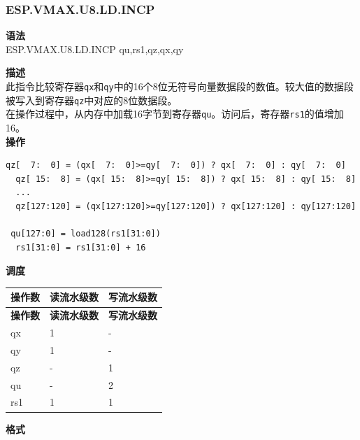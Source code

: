 \newpage
\subsubsection{ESP.VMAX.U8.LD.INCP}\label{instruction:ESPVMAXU8LDINCP}
\textbf{语法}\\
ESP.VMAX.U8.LD.INCP qu,rs1,qz,qx,qy

\textbf{描述}\\
此指令比较寄存器\lstinline{qx}和\lstinline{qy}中的16个8位无符号向量数据段的数值。较大值的数据段被写入到寄存器\lstinline{qz}中对应的8位数据段。\\在操作过程中，从内存中加载16字节到寄存器\lstinline{qu}。访问后，寄存器\lstinline{rs1}的值增加16。\\
\textbf{操作}
\begin{lstlisting}[escapeinside=`?]
  qz[  7:  0] = (qx[  7:  0]>=qy[  7:  0]) ? qx[  7:  0] : qy[  7:  0]
  qz[ 15:  8] = (qx[ 15:  8]>=qy[ 15:  8]) ? qx[ 15:  8] : qy[ 15:  8]
  ...
  qz[127:120] = (qx[127:120]>=qy[127:120]) ? qx[127:120] : qy[127:120]

 qu[127:0] = load128(rs1[31:0])
  rs1[31:0] = rs1[31:0] + 16
\end{lstlisting}


\textbf{调度}\\
\begin{longtable}[c]{|l|l|l|}
    \hline
    \rowcolor{lightgray}
    \textbf{操作数} & \textbf{读流水级数} & \textbf{写流水级数} \\\hline
    \endfirsthead
    \hline
    \rowcolor{lightgray}
     \textbf{操作数} & \textbf{读流水级数} & \textbf{写流水级数} \\\hline
    \endhead
    \hline
    \endfoot

    qx & 1 & - \\\hline
  qy & 1 & - \\\hline
     qz & - & 1 \\\hline
     qu & - & 2 \\\hline
     rs1 & 1 & 1

\end{longtable}

\textbf{格式}\\

